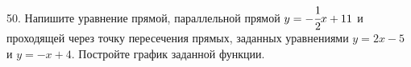 50. Напишите уравнение прямой, параллельной прямой $y=-\cfrac{1}{2}x+11$  и проходящей через точку пересечения прямых, заданных уравнениями $y=2x-5$ и $y=-x+4.$ Постройте график заданной функции.\\
